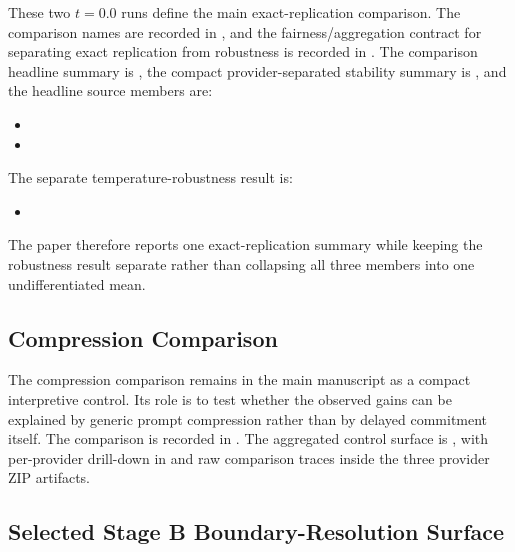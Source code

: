\documentclass[11pt,a4paper]{article}
\begin{document}
These two \(t=0.0\) runs define the main exact-replication comparison. The
comparison names are recorded in
, and
the fairness/aggregation contract for separating exact replication from
robustness is recorded in
. The
comparison headline summary is
,
the compact provider-separated stability summary is
,
and the headline source members are:
\begin{itemize}
  \item {}
  \item {}
\end{itemize}
The separate temperature-robustness result is:
\begin{itemize}
  \item {}
\end{itemize}
The paper therefore reports one exact-replication summary while keeping the
robustness result separate rather than collapsing all three members into one
undifferentiated mean.

\subsection{Compression Comparison}

The compression comparison remains in the main manuscript as a compact
interpretive control. Its role is to test whether the observed gains can be
explained by generic prompt compression rather than by delayed commitment
itself. The comparison is recorded in
. The
aggregated control surface is
,
with per-provider drill-down in
and raw comparison traces inside the three provider ZIP artifacts.

\subsection{Selected Stage B Boundary-Resolution Surface}
\end{document}
